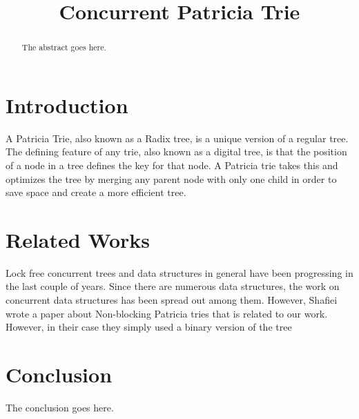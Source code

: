 \documentclass[conference]{IEEEtran}
\begin{document}
\title{Concurrent Patricia Trie}

\author{
\and
{}
}

\maketitle


\begin{abstract}
The abstract goes here.
\end{abstract}


\section{Introduction}
A Patricia Trie, also known as a Radix tree, is a unique version of a regular tree. The defining feature of any trie, also known
as a digital tree, is that the position of a node in a tree defines the key for that node. A Patricia trie takes this and optimizes the tree by 
merging any parent node with only one child in order to save space and create a more efficient tree.\cite{Shafiei2013} \par



\section{Related Works}
Lock free concurrent trees and data structures in general have been progressing in the last couple of years. \cite{Brown2014,Brown2013}
Since there are numerous data structures, the work on concurrent data structures has been spread out among them. However, Shafiei wrote
a paper about Non-blocking Patricia tries \cite{Shafiei2013} that is related to our work. However, in their case they simply used a binary version of the tree 



\section{Conclusion}
The conclusion goes here.






\end{document}
